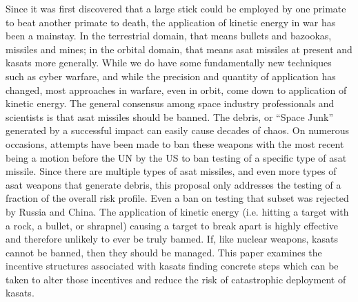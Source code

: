 
\maketitle

\pagestyle{execSummary}
\thispagestyle{firstPage}



Since it was first discovered that a large stick could be employed by
one primate to beat another primate to death, the application of
kinetic energy in war has been a mainstay.  In the terrestrial domain,
that means bullets and bazookas, missiles and mines; in the orbital
domain, that means \ac{asat} missiles at present and \acp{kasat} more
generally.  While we do have some fundamentally new techniques such as
cyber warfare\cite{big-risks}, and while the precision and quantity of
application has changed, most approaches in warfare, even in orbit,
come down to application of kinetic energy.\cite{brian} The general
consensus among space industry professionals and scientists is that
\ac{asat} missiles should be
banned.\cite{uocs-no-likey}\cite{carnegie-no-likey} The debris, or
``Space Junk'' generated by a successful impact can easily cause
decades of chaos.\cite{osa-debris} On numerous occasions, attempts
have been made to ban these weapons\cite{early-to-call} with the most
recent being a motion before the UN by the US to ban testing of a
specific type of \ac{asat} missile.\cite{un-asat-me-not} Since there
are multiple types of \ac{asat} missiles, and even more types of
\ac{asat} weapons that generate debris, this proposal only addresses
the testing of a fraction of the overall risk profile.\cite{brian}
Even a ban on testing that subset was rejected by Russia and
China.\cite{not-so-chinese} The application of kinetic energy
(i.e. hitting a target with a rock, a bullet, or shrapnel) causing a
target to break apart is highly effective and therefore unlikely to
ever be truly banned.  If, like nuclear weapons, \acp{kasat} cannot be
banned, then they should be managed.  This paper examines the
incentive structures associated with \acp{kasat} finding concrete
steps which can be taken to alter those incentives and reduce the risk
of catastrophic deployment of \acp{kasat}.

